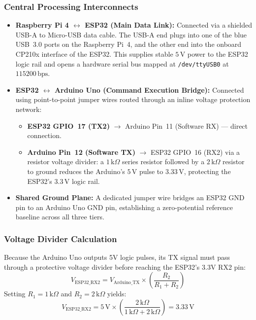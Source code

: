 \documentclass[conference]{IEEEtran}
\begin{document}
\subsubsection{Central Processing Interconnects}
\begin{itemize}
    \item \textbf{Raspberry Pi 4 $\longleftrightarrow$ ESP32 (Main Data Link):} Connected via a shielded USB-A to Micro-USB data cable. The USB-A end plugs into one of the blue USB~3.0 ports on the Raspberry Pi~4, and the other end into the onboard CP210x interface of the ESP32. This supplies stable $5\,\text{V}$ power to the ESP32 logic rail and opens a hardware serial bus mapped at \texttt{/dev/ttyUSB0} at $115200\,\text{bps}$.

    \item \textbf{ESP32 $\longleftrightarrow$ Arduino Uno (Command Execution Bridge):} Connected using point-to-point jumper wires routed through an inline voltage protection network:
    \begin{itemize}
        \item \textbf{ESP32 GPIO~17 (TX2)} $\longrightarrow$ Arduino Pin~11 (Software RX) — direct connection.
        \item \textbf{Arduino Pin~12 (Software TX)} $\longrightarrow$ ESP32 GPIO~16 (RX2) via a resistor voltage divider: a $1\,\text{k}\Omega$ series resistor followed by a $2\,\text{k}\Omega$ resistor to ground reduces the Arduino's $5\,\text{V}$ pulse to $3.33\,\text{V}$, protecting the ESP32's $3.3\,\text{V}$ logic rail.
    \end{itemize}

    \item \textbf{Shared Ground Plane:} A dedicated jumper wire bridges an ESP32 GND pin to an Arduino Uno GND pin, establishing a zero-potential reference baseline across all three tiers.
\end{itemize}

\subsubsection{Voltage Divider Calculation}
Because the Arduino Uno outputs 5V logic pulses, its TX signal must pass through a protective voltage divider before reaching the ESP32's 3.3V RX2 pin:
\begin{equation}
V_{\text{ESP32\_RX2}} = V_{\text{Arduino\_TX}} \times \left( \frac{R_2}{R_1 + R_2} \right)
\end{equation}
Setting $R_1 = 1\,\text{k}\Omega$ and $R_2 = 2\,\text{k}\Omega$ yields:
\begin{equation}
V_{\text{ESP32\_RX2}} = 5\,\text{V} \times \left( \frac{2\,\text{k}\Omega}{1\,\text{k}\Omega + 2\,\text{k}\Omega} \right) = 3.33\,\text{V}
\end{equation}
\end{document}

